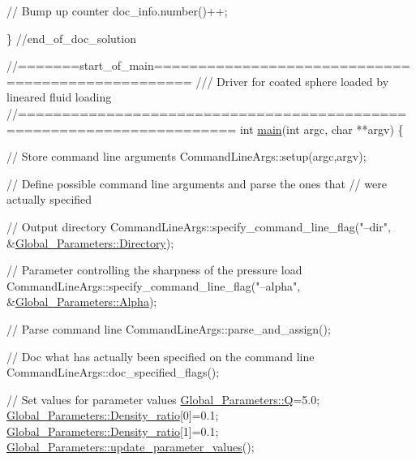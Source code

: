 \begin{DoxyCodeInclude}
{{{{{{ \textcolor{comment}{// Bump up counter}
 doc\_info.number()++;

\} \textcolor{comment}{//end\_of\_doc\_solution}



\textcolor{comment}{//=======start\_of\_main==================================================}\textcolor{comment}{}
\textcolor{comment}{/// Driver for coated sphere loaded by lineared fluid loading}
\textcolor{comment}{}\textcolor{comment}{//======================================================================}
\textcolor{keywordtype}{int} \hyperlink{fourier__decomposed__acoustic__fsi_8cc_a3c04138a5bfe5d72780bb7e82a18e627}{main}(\textcolor{keywordtype}{int} argc, \textcolor{keywordtype}{char} **argv)
\{

 \textcolor{comment}{// Store command line arguments}
 CommandLineArgs::setup(argc,argv);

 \textcolor{comment}{// Define possible command line arguments and parse the ones that}
 \textcolor{comment}{// were actually specified}
 
 \textcolor{comment}{// Output directory}
 CommandLineArgs::specify\_command\_line\_flag(\textcolor{stringliteral}{"--dir"},
                                            &\hyperlink{namespaceGlobal__Parameters_a301ab922df72030c660b21328d6caf76}{Global\_Parameters::Directory});
 
 \textcolor{comment}{// Parameter controlling the sharpness of the pressure load}
 CommandLineArgs::specify\_command\_line\_flag(\textcolor{stringliteral}{"--alpha"},
                                            &\hyperlink{namespaceGlobal__Parameters_afbe27ad463a1fb23cb99d029a9fac731}{Global\_Parameters::Alpha});
 
 \textcolor{comment}{// Parse command line}
 CommandLineArgs::parse\_and\_assign(); 
 
 \textcolor{comment}{// Doc what has actually been specified on the command line}
 CommandLineArgs::doc\_specified\_flags();



 \textcolor{comment}{// Set values for parameter values}
 \hyperlink{namespaceGlobal__Parameters_a7814fddf663e56168174a42d2cd6b4c1}{Global\_Parameters::Q}=5.0; 
 \hyperlink{namespaceGlobal__Parameters_a517d4c31b8bce6563c2f605266dd9679}{Global\_Parameters::Density\_ratio}[0]=0.1; 
 \hyperlink{namespaceGlobal__Parameters_a517d4c31b8bce6563c2f605266dd9679}{Global\_Parameters::Density\_ratio}[1]=0.1; 
 \hyperlink{namespaceGlobal__Parameters_ae0f9a80fb7510dbfbbef22582da231b7}{Global\_Parameters::update\_parameter\_values}();

}}}}}}
\end{DoxyCodeInclude}
